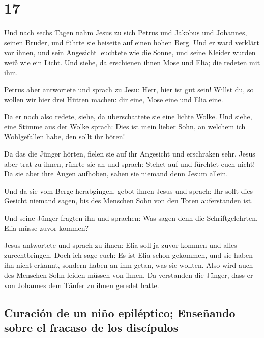 \hypertarget{section-16}{%
\section{17}\label{section-16}}

 Und nach sechs Tagen nahm Jesus zu sich Petrus und
Jakobus und Johannes, seinen Bruder, und führte sie beiseite auf einen
hohen Berg.  Und er ward verklärt vor ihnen, und sein
Angesicht leuchtete wie die Sonne, und seine Kleider wurden weiß wie ein
Licht.  Und siehe, da erschienen ihnen Mose und Elia; die
redeten mit ihm.

 Petrus aber antwortete und sprach zu Jesu: Herr, hier ist
gut sein! Willst du, so wollen wir hier drei Hütten machen: dir eine,
Mose eine und Elia eine.

 Da er noch also redete, siehe, da überschattete sie eine
lichte Wolke. Und siehe, eine Stimme aus der Wolke sprach: Dies ist mein
lieber Sohn, an welchem ich Wohlgefallen habe, den sollt ihr hören!

 Da das die Jünger hörten, fielen sie auf ihr Angesicht
und erschraken sehr.  Jesus aber trat zu ihnen, rührte sie
an und sprach: Stehet auf und fürchtet euch nicht!  Da sie
aber ihre Augen aufhoben, sahen sie niemand denn Jesum allein.

 Und da sie vom Berge herabgingen, gebot ihnen Jesus und
sprach: Ihr sollt dies Gesicht niemand sagen, bis des Menschen Sohn von
den Toten auferstanden ist.

 Und seine Jünger fragten ihn und sprachen: Was sagen
denn die Schriftgelehrten, Elia müsse zuvor kommen?

 Jesus antwortete und sprach zu ihnen: Elia soll ja zuvor
kommen und alles zurechtbringen.  Doch ich sage euch: Es
ist Elia schon gekommen, und sie haben ihn nicht erkannt, sondern haben
an ihm getan, was sie wollten. Also wird auch des Menschen Sohn leiden
müssen von ihnen.  Da verstanden die Jünger, dass er von
Johannes dem Täufer zu ihnen geredet hatte.

\hypertarget{curaciuxf3n-de-un-niuxf1o-epiluxe9ptico-enseuxf1ando-sobre-el-fracaso-de-los-discuxedpulos}{%
\subsection{Curación de un niño epiléptico; Enseñando sobre el fracaso
de los
discípulos}\label{curaciuxf3n-de-un-niuxf1o-epiluxe9ptico-enseuxf1ando-sobre-el-fracaso-de-los-discuxedpulos}}

